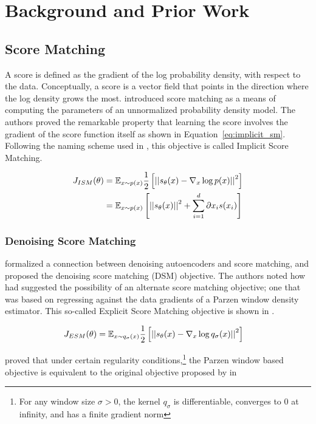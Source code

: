 \chapter{Background and Prior Work}
\label{ch:background}

\section{Score Matching}
A score is defined as the gradient of the log probability density, with respect to the data. Conceptually, a score is a vector field that points in the direction where the log density grows the most. 
\cite{hyvarinen2005} introduced score matching as a means of computing the parameters of an unnormalized probability density model. The authors proved the remarkable property that learning the score involves the gradient of the score function itself as shown in Equation~\ref{eq:implicit_sm}. Following the naming scheme used in \cite{vincent2011connection}, this objective is called Implicit Score Matching.

\begin{align}
\label{eq:implicit_sm}
    J_{ISM}(\theta) &= \mathbb{E}_{x \sim p(x)} \frac{1}{2} \left[ { \left|\left| {s_\theta(x) - \nabla_x \log p(x) } \right|\right|^2 } \right] \\
    &= \mathbb{E}_{x \sim p(x)} \left[ { \left|\left| {s_\theta(x)} \right|\right|^2 + \sum^{d}_{i=1}{\partial{x_{i}} s(x_{i}) } } \right]
\end{align}


\subsection*{Denoising Score Matching}

\cite{vincent2011connection} formalized a connection between denoising autoencoders and score matching, and proposed the denoising score matching (DSM) objective. The authors noted how \cite{hyvarinen2005} had suggested the possibility of an alternate score matching objective; one that was based on regressing against the data gradients of a Parzen window density estimator. This so-called Explicit Score Matching objective is shown in .

\begin{align}
\label{eq:explicit_sm}
    J_{ESM}(\theta) &= \mathbb{E}_{x \sim q_{\sigma}(x)} \frac{1}{2} \left[ { \left|\left| {s_\theta(x) - \nabla_x \log q_{\sigma}(x) } \right|\right|^2 } \right]
\end{align}

\cite{vincent2011connection} proved that under certain regularity conditions,\footnote{For any window size $\sigma > 0$, the kernel $q_{\sigma}$ is differentiable, converges to 0 at infinity, and has a finite gradient norm}
the Parzen window based objective is equivalent to the original objective proposed by \cite{hyvarinen2005} in 

